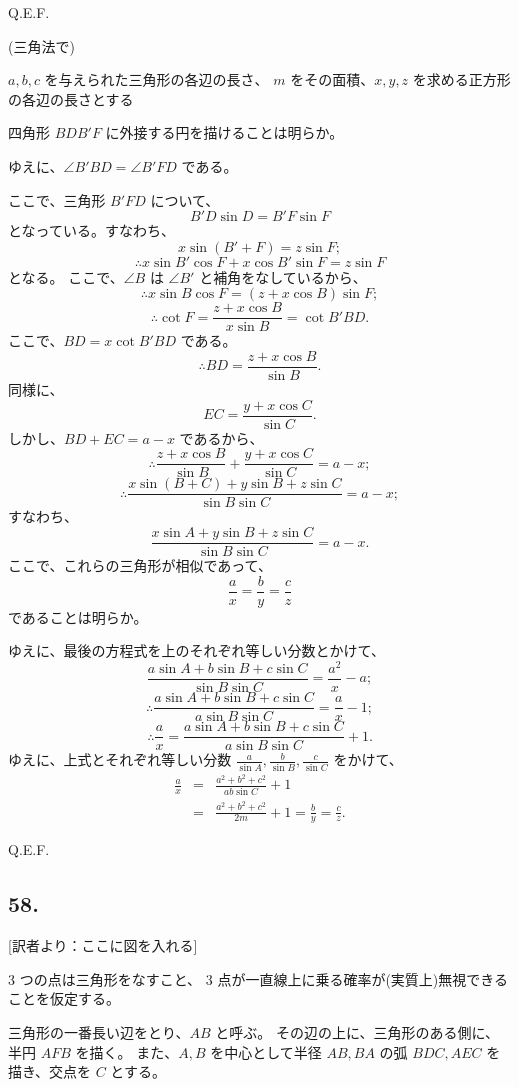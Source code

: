 Q.E.F.


(三角法で)

$a, b, c$ を与えられた三角形の各辺の長さ、
$m$ をその面積、$x, y, z$ を求める正方形の各辺の長さとする

四角形 $BDB'F$ に外接する円を描けることは明らか。

ゆえに、$\angle B'BD = \angle B'FD$ である。

ここで、三角形 $B'FD$ について、
\[
B'D \sin D = B'F \sin F
\]
となっている。すなわち、
\[
x \sin (B' + F) = z \sin F;
\]
\[
\therefore
x \sin B' \cos F + x \cos B' \sin F = z \sin F
\]
となる。
ここで、$\angle B$ は $\angle B'$ と補角をなしているから、
\[
\therefore
x \sin B \cos F = (z + x \cos B) \sin F;
\]
\[
\therefore
\cot F = \frac{z + x \cos B}{x \sin B} = \cot B'BD.
\]
ここで、$BD = x \cot B'BD$ である。
\[
\therefore
BD = \frac{z + x \cos B}{\sin B}.
\]
同様に、
\[
EC = \frac{y + x \cos C}{\sin C}.
\]
しかし、$BD + EC = a - x$ であるから、
\[
\therefore
\frac{z + x \cos B}{\sin B} + \frac{y + x \cos C}{\sin C}
= a - x;
\]
\[
\therefore
\frac{x \sin (B + C) + y \sin B + z \sin C}{\sin B \sin C}
= a - x;
\]
すなわち、
\[
\frac{x \sin A + y \sin B + z \sin C}{\sin B \sin C}
= a - x.
\]
ここで、これらの三角形が相似であって、
\[
\frac{a}{x} = \frac{b}{y} = \frac{c}{z}
\]
であることは明らか。

ゆえに、最後の方程式を上のそれぞれ等しい分数とかけて、
\[
\frac{a \sin A + b \sin B + c \sin C}{\sin B \sin C}
 = \frac{a^2}{x} - a;
\]
\[
\therefore
\frac{a \sin A + b \sin B + c \sin C}{a \sin B \sin C}
 = \frac{a}{x} - 1;
\]
\[
\therefore
\frac{a}{x} =
\frac{a \sin A + b \sin B + c \sin C}{a \sin B \sin C} + 1.
\]
ゆえに、上式とそれぞれ等しい分数 $\frac{a}{\sin A}, \frac{b}{\sin B}, \frac{c}{\sin C}$ をかけて、
\begin{eqnarray*}
\frac{a}{x} &=& \frac{a^2 + b^2 + c^2}{ab \sin C} + 1\\
&=& \frac{a^2 + b^2 + c^2}{2m} + 1 = \frac{b}{y} = \frac{c}{z}.
\end{eqnarray*}

Q.E.F.


\subsection*{58.}

[訳者より：ここに図を入れる] 

3 つの点は三角形をなすこと、
3 点が一直線上に乗る確率が(実質上)無視できることを仮定する。

三角形の一番長い辺をとり、$AB$ と呼ぶ。
その辺の上に、三角形のある側に、半円 $AFB$ を描く。
また、$A, B$ を中心として半径 $AB, BA$ の弧 $BDC, AEC$
を描き、交点を $C$ とする。

